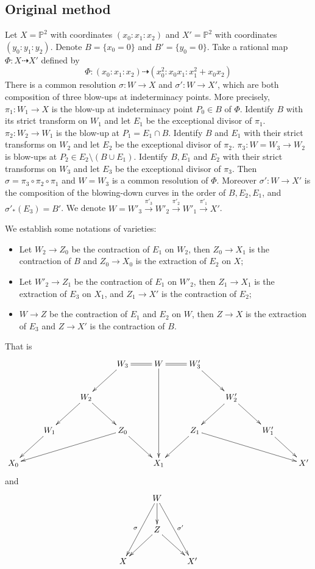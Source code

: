\documentclass[11pt]{amsart}
\begin{document}
\subsection{Original method}\label{example1}
Let $ X=\mathbb{P}^2 $ with coordinates $ (x_0:x_1:x_2) $ and $ X'=\mathbb{P}^2 $ with coordinates $ (y_0:y_1:y_2) $.
Denote $ B=\{x_0=0\} $ and $B'=\{y_{0}=0\} $.
Take a rational map $ \Phi:X\dashrightarrow X' $ defined by 
\[ \Phi:(x_0:x_1:x_2)\dashrightarrow (x_0^2:x_0x_1:x_1^2+x_0x_2) \]
There is a  common resolution $\sigma:W\to X$ and $\sigma':W\to X'$, which are both composition of three blow-ups at indeterminacy points.
More precisely, $\pi_{1}:W_{1}\to X$ is the blow-up at indeterminacy point $P_{0} \in B$ of $\Phi$. Identify $B$ with its strict transform on $W_{1}$ and let $E_{1}$ be the exceptional divisor of $\pi_{1}$.
$\pi_{2}:W_{2}\to W_{1}$ is the blow-up at $P_{1}=E_{1} \cap B$. Identify $B$ and $E_{1}$ with their strict transforms on $W_{2}$ and let $E_{2}$ be the exceptional divisor of $\pi_{2}$.
$\pi_{3}:W=W_{3}\to W_{2}$ is blow-ups at $P_{2} \in E_{2} \setminus (B\cup E_{1})$. Identify  $B, E_{1}$ and $E_{2}$ with their strict transforms   on $W_{3}$ and let $E_{3}$ be the exceptional divisor of $\pi_{3}$.
Then $ \sigma=\pi_{3}\circ \pi_{2} \circ \pi_{1} $ and $ W=W_3 $ is a common resolution of $\Phi$. Moreover $ \sigma':W\to X' $ is the composition of the blowing-down curves in the order of $ B,E_2,E_1 $, and $\sigma'_*(E_{3})=B'$. We denote  $W=W'_{3}\xrightarrow{\pi'_{3}} W'_{2}\xrightarrow{\pi'_{2}} W'_{1} \xrightarrow{\pi'_{1}} X'$.

We establish some notations of varieties:
\begin{itemize}
  \item Let $W_{2}\to Z_{0}$ be the contraction of $E_{1}$ on $W_{2}$, then $Z_{0} \to X_{1}$ is the contraction of $B$  and $Z_{0}\to X_{0}$ is the extraction of $E_{2}$ on $X$;
 \item Let $W'_{2}\to Z_{1}$ be the contraction of $E_{1}$ on $W'_{2}$, then $Z_{1} \to X_{1}$ is the extraction of $E_{3}$ on $X_{1}$, and $Z_{1}\to X'$ is the contraction of $E_{2}$;
 \item $W\to Z$ be the contraction of $E_{1}$ and $E_{2}$ on $W$, then $Z\to X$ is the extraction of $E_{3}$ and $Z\to X'$ is the contraction of $B$.
\end{itemize}
That is
    \[ \xymatrix{&&&W_3\ar[ld]\ar@{=}[r]&W\ar[ddd]\ar@{=}[r]&W_3'\ar[rd]\\
      &&W_2\ar[ld]\ar[rd]&&&&W_2'\ar[rd]\ar[dl]\\
      &W_1\ar[ld]&&Z_0\ar[llld]\ar[rd]&&Z_1\ar[ld]\ar[rrrd]&&W_1'\ar[rd]\\
      X_0&&&&X_1&&&&X'
    } \]
    and 
    \[\xymatrix{
      &W\ar[d]\ar[ddl]_{\sigma}\ar[ddr]^{\sigma'}&\\
      &Z\ar[dl]\ar[dr]\\
      X&&X' }  \]
    
\end{document}
